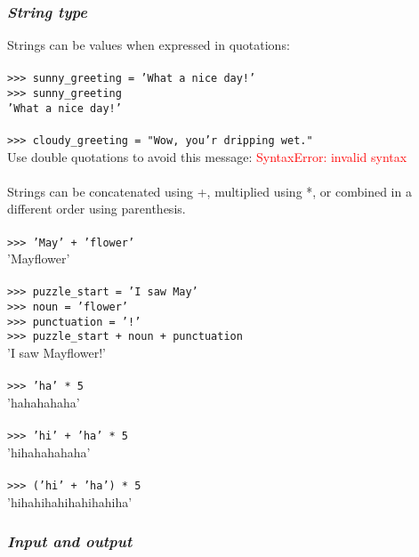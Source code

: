 \documentclass{article}
\begin{document}
{{{\subsubsection{\small\textsl{String type}}
Strings can be values when expressed in quotations:\\
\\
\texttt{>>> sunny\_greeting = 'What a nice day!'}\\
\texttt{>>> sunny\_greeting}\\
\texttt{'What a nice day!'}\\
\\
\texttt{>>> cloudy\_greeting = "Wow, you'r dripping wet."}\\
Use double quotations to avoid this message:
\textcolor{red}{SyntaxError: invalid syntax}\\
\\
Strings can be concatenated using +, multiplied using *, or combined in a different order using parenthesis.\\
\\
\texttt{>>> 'May' + 'flower'}\\
'Mayflower'\\
\\
\texttt{>>> puzzle\_start = 'I saw May'}\\
\texttt{>>> noun = 'flower'}\\
\texttt{>>> punctuation = '!'}\\
\texttt{>>> puzzle\_start + noun + punctuation}\\
'I saw Mayflower!' \\
\\
\texttt{>>> 'ha' * 5}\\
'hahahahaha'\\
\\
\texttt{>>> 'hi' + 'ha' * 5}\\
'hihahahahaha'\\
\\
\texttt{>>> ('hi' + 'ha') * 5}\\
'hihahihahihahihahiha'\\

\subsubsection{\small\textsl{Input and output}}
}}}
\end{document}

